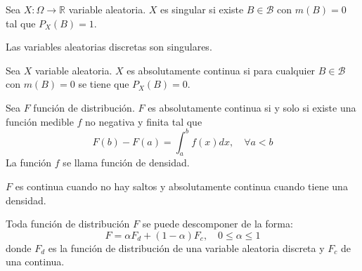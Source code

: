 \begin{definition}
    Sea $X: \Omega \to \mathbb{R}$ variable aleatoria.
    $X$ es singular si existe $B \in \mathcal{B}$ con $m(B) = 0$ tal que $P_X(B) = 1$.
\end{definition}

\begin{remark}
    Las variables aleatorias discretas son singulares.
\end{remark}

\begin{definition}
    Sea $X$ variable aleatoria.
    $X$ es absolutamente continua si para cualquier $B \in \mathcal{B}$ con $m(B) = 0$ se tiene que $P_X(B) = 0$.
\end{definition}

\begin{theorem}
    Sea $F$ función de distribución.
    $F$ es absolutamente continua si y solo si existe una función medible $f$ no negativa y finita tal que
    $$F(b) - F(a) = \int_a^b f(x) dx, \quad \forall a < b$$
    La función $f$ se llama función de densidad.
\end{theorem}

\begin{remark}
    $F$ es continua cuando no hay saltos y absolutamente continua cuando tiene una densidad.
\end{remark}

\begin{theorem}
    Toda función de distribución $F$ se puede descomponer de la forma:
    $$F = \alpha F_d + (1-\alpha)F_c, \quad 0 \leq \alpha \leq 1$$
    donde $F_d$ es la función de distribución de una variable aleatoria discreta y $F_c$ de una continua.
\end{theorem}

